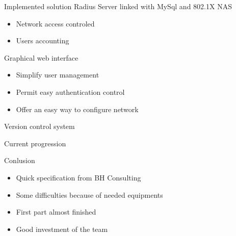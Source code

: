 \documentclass[12pt]{beamer}
\begin{document}
\begin{frame}{Implemented solution}
    Radius Server linked with MySql and 802.1X NAS
    \begin{itemize}
	\item Network access controled
	\item Users accounting
    \end{itemize}
    \vfill
    Graphical web interface
    \begin{itemize}
	\item<1-> Simplify user management
	\item<2-> Permit easy authentication control
	\item<3-> Offer an easy way to configure network
    \end{itemize}
    \vfill
    Version control system
\end{frame}

\begin{frame}{Current progression}
\end{frame}


\begin{frame}{Conlusion}
    \begin{itemize}
	\item<1->Quick specification from BH Consulting
	\vfill
	\item<2->Some difficulties because of needed equipments
	\vfill
	\item<3->First part almost finished
	\vfill
	\item<4->Good investment of the team
    \end{itemize}
\end{frame}
\end{document}
